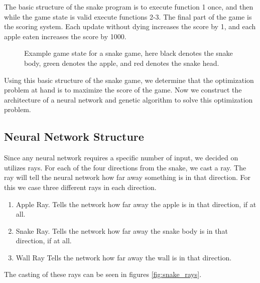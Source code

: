 \documentclass{amsart}
\begin{document}
The basic structure of the snake program is to execute function 1 once, and
then while the game state is valid execute functions 2-3. The final part of the
game is the scoring system. Each update without dying increases the score by
1, and each apple eaten increases the score by 1000.

\begin{figure}[htpb]
  \begin{center}
  \end{center}
  \caption{Example game state for a snake game, here black denotes the snake
  body, green denotes the apple, and red denotes the snake head.}
  \label{fig:snake_game}
\end{figure}


Using this basic structure of the snake game, we determine that the
optimization problem at hand is to maximize the score of the game. Now we
construct the architecture of a neural network and genetic algorithm to solve
this optimization problem.

\subsection{Neural Network Structure}

Since any neural network requires a specific number of input, we decided on
utilizes rays. For each of the four directions from the snake, we cast a ray.
The ray will tell the neural network how far away something is in that
direction. For this we case three different rays in each direction.
\begin{enumerate}
  \item Apple Ray. Tells the network how far away the apple is in that
    direction, if at all.
  \item Snake Ray. Tells the network how far away the snake body is in that
    direction, if at all.
  \item Wall Ray Tells the network how far away the wall is in that direction.
\end{enumerate}
The casting of these rays can be seen in figures \ref{fig:snake_rays}.
\end{document}
